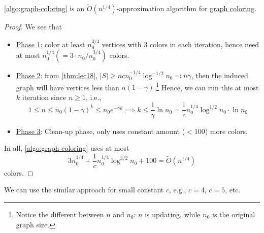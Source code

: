 \begin{theorem}
	\autoref{algo:graph-coloring} is an \(\widetilde{O} (n^{1 / 4})\)-approximation algorithm for \hyperref[prb:graph-coloring]{graph coloring}.
\end{theorem}
\begin{proof}
	We see that
	\begin{itemize}
		\item \hyperref[algo:graph-coloring-phase-1]{Phase 1}: color at least \(n_0^{3 / 4}\) vertices with \(3\) colors in each iteration, hence need at most \(n_0^{1 / 4} (= 3\cdot n_0 / n_0^{3 / 4})\) colors.
		\item \hyperref[algo:graph-coloring-phase-2]{Phase 2}: from \autoref{thm:lec18}, \(\left\vert S \right\vert \geq n c n_0^{-1 / 4} \log ^{-1 / 2} n_0 \eqqcolon n \gamma \), then the induced graph will have vertices less than \(n(1 - \gamma )\).\footnote{Notice the different between \(n\) and \(n_0\): \(n\) is updating, while \(n_0\) is the original graph size.} Hence, we can run this at most \(k\) iteration since \(n \geq 1\), i.e.,
		      \[
			      1 \leq n \leq n_0 (1 - \gamma )^k \leq n_0 e^{-\gamma k} \implies k \leq \frac{1}{\gamma} \ln n_0 = \frac{1}{c} n_0^{1 / 4}\log ^{1 / 2}n_0\cdot \ln n_0
		      \]
		\item \hyperref[algo:graph-coloring-phase-3]{Phase 3}: Clean-up phase, only uses constant amount (\(< 100\)) more colors.
	\end{itemize}
	In all, \autoref{algo:graph-coloring} uses at most
	\[
		3n_0^{1 / 4} + \frac{1}{c} n_0^{1 / 4} \log ^{3 / 2}n_0 + 100 = \widetilde{O} (n^{1 / 4})
	\]
	colors.
\end{proof}

\begin{remark}
	We can use the similar approach for small constant \(c\), e.g., \(c=4\), \(c=5\), etc.
\end{remark}
